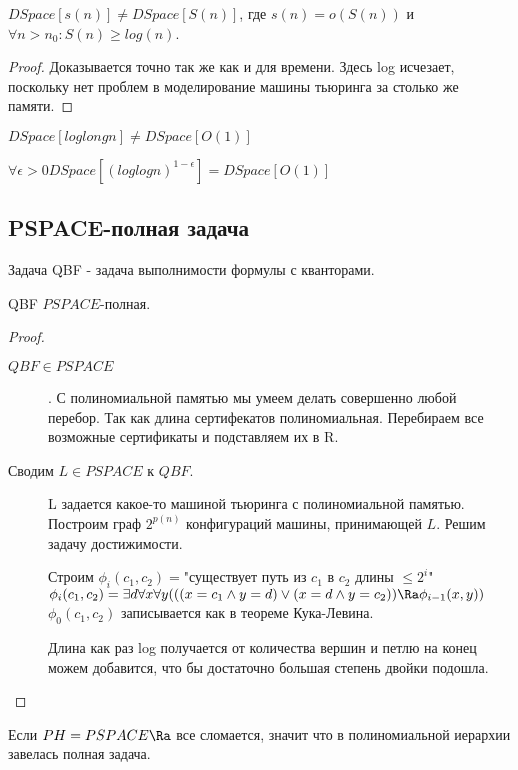 \begin{theorem}
	$DSpace[s(n)] \ne DSpace[S(n)]$, где $s(n) = o(S(n))$ и 
	$\forall n > n_0 \colon S(n) \ge log(n)$.
\end{theorem}
\begin{proof}
	Доказывается точно так же как и для времени. Здесь log
	исчезает, поскольку нет проблем в моделирование машины тьюринга
	за столько же памяти. 
\end{proof}
\begin{theorem}
	$DSpace[log long n] \ne DSpace[O(1)]$\\
\end{theorem}
\begin{theorem}
	$\forall \epsilon > 0 DSpace[(log log n)^{1 - \epsilon}] = DSpace[O(1)]$
\end{theorem}


\subsection{PSPACE-полная задача}
\begin{Def}
	Задача QBF - задача выполнимости формулы с кванторами. 
\end{Def}
\begin{theorem}
	QBF $PSPACE$-полная. 
\end{theorem}
\begin{proof}
	\begin{description}
	\item[$QBF \in  PSPACE$]. 
	С полиномиальной памятью мы умеем делать совершенно любой перебор. 
	Так как длина сертифекатов полиномиальная. 
	Перебираем все возможные сертификаты и подставляем их в R.

	\item[Сводим $L \in PSPACE$ к $QBF$.]
	L задается какое-то машиной тьюринга с полиномиальной памятью.\\ 
	
	Построим граф $2^{p(n)}$ конфигураций машины, принимающей $L$. Решим задачу достижимости.

	Строим $\phi_i(c_1, c_2) = $"существует путь из $c_1$ в $c_2$ длины $\le 2^i$"\\
	
	$\phi_i(c_1, c_2) = \exists d \forall x \forall y(((x = c_1 \wedge y = d) \vee (x = d \wedge y = c_2)) \Ra \phi_{i - 1}(x, y))$\\
	$\phi_0(c_1, c_2)$ записывается как в теореме Кука-Левина.  
	
	Длина как раз log получается от количества вершин и петлю на конец можем добавится, что бы достаточно большая степень двойки подошла.
	\end{description}
\end{proof}

\begin{conseq}
	Если $PH = PSPACE \Ra$ все сломается, значит что в полиномиальной иерархии завелась полная задача. 
\end{conseq}